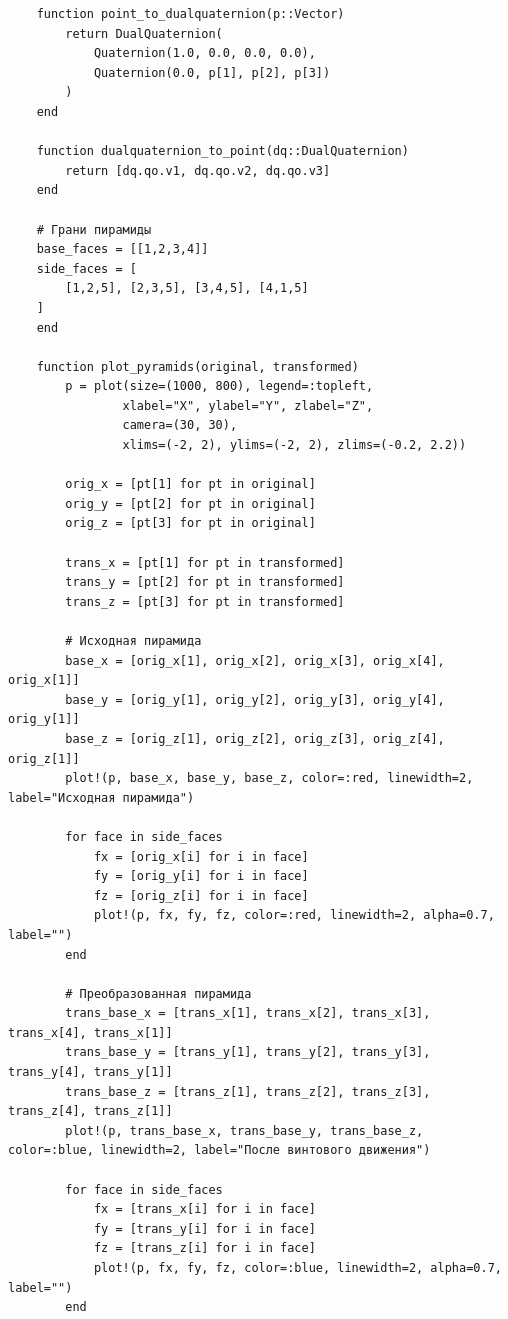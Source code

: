 \begin{verbatim}
    function point_to_dualquaternion(p::Vector)
        return DualQuaternion(
            Quaternion(1.0, 0.0, 0.0, 0.0),
            Quaternion(0.0, p[1], p[2], p[3])
        )
    end
    
    function dualquaternion_to_point(dq::DualQuaternion)
        return [dq.qo.v1, dq.qo.v2, dq.qo.v3]
    end
    
    # Грани пирамиды
    base_faces = [[1,2,3,4]]
    side_faces = [
        [1,2,5], [2,3,5], [3,4,5], [4,1,5]
    ]
    end

    function plot_pyramids(original, transformed)
        p = plot(size=(1000, 800), legend=:topleft, 
                xlabel="X", ylabel="Y", zlabel="Z",
                camera=(30, 30),
                xlims=(-2, 2), ylims=(-2, 2), zlims=(-0.2, 2.2))
        
        orig_x = [pt[1] for pt in original]
        orig_y = [pt[2] for pt in original] 
        orig_z = [pt[3] for pt in original]
        
        trans_x = [pt[1] for pt in transformed]
        trans_y = [pt[2] for pt in transformed]
        trans_z = [pt[3] for pt in transformed]

        # Исходная пирамида
        base_x = [orig_x[1], orig_x[2], orig_x[3], orig_x[4], orig_x[1]]
        base_y = [orig_y[1], orig_y[2], orig_y[3], orig_y[4], orig_y[1]]
        base_z = [orig_z[1], orig_z[2], orig_z[3], orig_z[4], orig_z[1]]
        plot!(p, base_x, base_y, base_z, color=:red, linewidth=2, label="Исходная пирамида")
        
        for face in side_faces
            fx = [orig_x[i] for i in face]
            fy = [orig_y[i] for i in face] 
            fz = [orig_z[i] for i in face]
            plot!(p, fx, fy, fz, color=:red, linewidth=2, alpha=0.7, label="")
        end

        # Преобразованная пирамида
        trans_base_x = [trans_x[1], trans_x[2], trans_x[3], trans_x[4], trans_x[1]]
        trans_base_y = [trans_y[1], trans_y[2], trans_y[3], trans_y[4], trans_y[1]]
        trans_base_z = [trans_z[1], trans_z[2], trans_z[3], trans_z[4], trans_z[1]]
        plot!(p, trans_base_x, trans_base_y, trans_base_z, color=:blue, linewidth=2, label="После винтового движения")
        
        for face in side_faces
            fx = [trans_x[i] for i in face]
            fy = [trans_y[i] for i in face]
            fz = [trans_z[i] for i in face]
            plot!(p, fx, fy, fz, color=:blue, linewidth=2, alpha=0.7, label="")
        end


\end{verbatim}
